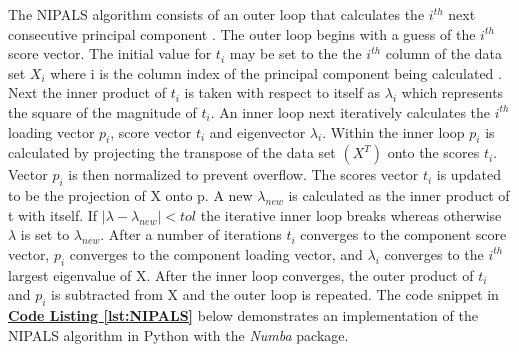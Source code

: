 \documentclass[12pt]{article}
\begin{document}
The NIPALS algorithm consists of an outer loop that calculates the $i^{th}$ next consecutive principal component . The outer loop begins with a guess of the $i^{th}$ score  vector. The initial value for $t_i$ may be set to the the $i^{th}$ column of the data set $X_i$ where i is the column index of the principal component being calculated \cite{risvik2007principal}. Next the inner product of $t_i$ is taken with respect to itself as $\lambda_i$ which represents the square of the magnitude of $t_i$. An inner loop next iteratively calculates the $i^{th}$ loading vector $p_i$, score vector $t_i$ and eigenvector $\lambda_i$. Within the inner loop $p_i$ is calculated by projecting the transpose of the data set $(X^T)$ onto the scores $t_i$. Vector $p_i$ is then normalized to prevent overflow. The scores vector $t_i$ is updated to be the projection of X onto p. A new $\lambda_{new}$ is calculated as the inner product of t with itself. If $|\lambda-\lambda_{new}|<tol$ the iterative inner loop breaks whereas otherwise $\lambda$ is set to $\lambda_{new}$.  After a number of iterations $t_i$ converges to the component score vector, $p_i$ converges to the component loading vector, and $\lambda_i$ converges to the $i^{th}$ largest eigenvalue of X. After the inner loop converges, the outer product of $t_i$ and $p_i$ is subtracted from X and the outer loop is repeated. The code snippet in \textbf{\hyperref[lst:NIPALS]{Code Listing \ref*{lst:NIPALS}}} below demonstrates an implementation of the NIPALS algorithm in Python with the \textit{Numba} \cite{numba} package.
\end{document}
